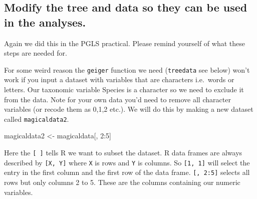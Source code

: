 \documentclass[]{book}
\newenvironment{Shaded}{\begin{snugshade}}{\end{snugshade}}
\newcommand{\KeywordTok}[1]{\textcolor[rgb]{0.13,0.29,0.53}{\textbf{{#1}}}}
\newcommand{\DecValTok}[1]{\textcolor[rgb]{0.00,0.00,0.81}{{#1}}}
\newcommand{\StringTok}[1]{\textcolor[rgb]{0.31,0.60,0.02}{{#1}}}
\newcommand{\CommentTok}[1]{\textcolor[rgb]{0.56,0.35,0.01}{\textit{{#1}}}}
\newcommand{\NormalTok}[1]{{#1}}
\theoremstyle{definition}
\theoremstyle{definition}
\theoremstyle{definition}
\theoremstyle{remark}
\begin{document}
\subsection{Modify the tree and data so they can be used in the
analyses.}\label{modify-the-tree-and-data-so-they-can-be-used-in-the-analyses.-1}

Again we did this in the PGLS practical. Please remind yourself of what
these steps are needed for.

\begin{Shaded}
\end{Shaded}

For some weird reason the \texttt{geiger} function we need
(\texttt{treedata} see below) won't work if you input a dataset with
variables that are characters i.e.~words or letters. Our taxonomic
variable Species is a character so we need to exclude it from the data.
Note for your own data you'd need to remove all character variables (or
recode them as 0,1,2 etc.). We will do this by making a new dataset
called \texttt{magicaldata2}.

\begin{Shaded}
\begin{Highlighting}[]
\NormalTok{magicaldata2 <-}\StringTok{ }\NormalTok{magicaldata[, }\DecValTok{2}\NormalTok{:}\DecValTok{5}\NormalTok{]}
\end{Highlighting}
\end{Shaded}

Here the \texttt{{[}\ {]}} tells R we want to subset the dataset. R data
frames are always described by \texttt{{[}X,\ Y{]}} where \texttt{X} is
rows and \texttt{Y} is columns. So \texttt{{[}1,\ 1{]}} will select the
entry in the first column and the first row of the data frame.
\texttt{{[},\ 2:5{]}} selects all rows but only columns 2 to 5. These
are the columns containing our numeric variables.
\end{document}
